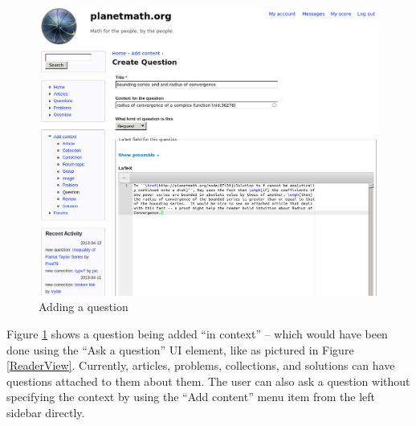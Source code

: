 \begin{vplace}[0.7]
\begin{figure}[h]
\begin{center}
\includegraphics[width=.85\textwidth]{./inputs/QuestionsPartI.png}
\end{center}
\caption{Adding a question \label{QuestionsPartI}}
\end{figure}
\bigskip

Figure \ref{QuestionsPartI} shows a question being added ``in
context'' -- which would have been done using the ``Ask a question''
UI element, like as pictured in Figure \ref{ReaderView}.  Currently,
articles, problems, collections, and solutions can have questions
attached to them about them.  The user can also ask a question without
specifying the context by using the ``Add content'' menu item from the
left sidebar directly.  
\end{vplace}

\newpage
\FloatBarrier

